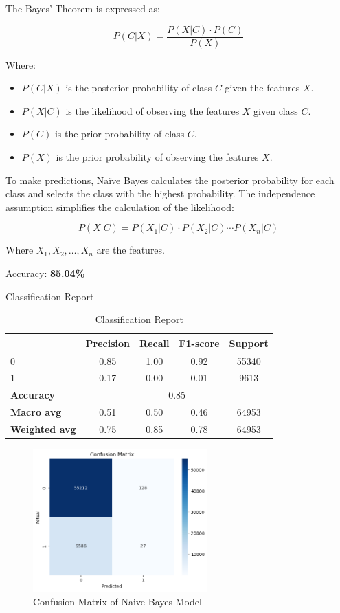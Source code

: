 The Bayes' Theorem is expressed as:

\[
P(C | X) = \frac{P(X | C) \cdot P(C)}{P(X)}
\]

Where:
\begin{itemize}
    \item \( P(C | X) \) is the posterior probability of class \( C \) given the features \( X \).
    \item \( P(X | C) \) is the likelihood of observing the features \( X \) given class \( C \).
    \item \( P(C) \) is the prior probability of class \( C \).
    \item \( P(X) \) is the prior probability of observing the features \( X \).
\end{itemize}

To make predictions, Naïve Bayes calculates the posterior probability for each class and selects the class with the highest probability. The independence assumption simplifies the calculation of the likelihood:

\[
P(X | C) = P(X_1 | C) \cdot P(X_2 | C) \cdots P(X_n | C)
\]

Where \( X_1, X_2, \ldots, X_n \) are the features.

Accuracy: \textbf{85.04\%}


Classification Report
\begin{table}[h]
    \centering
    \begin{tabular}{lcccc}
        \toprule
        & \textbf{Precision} & \textbf{Recall} & \textbf{F1-score} & \textbf{Support} \\
        \midrule
        0 & 0.85 & 1.00 & 0.92 & 55340 \\
        1 & 0.17 & 0.00 & 0.01 & 9613 \\
        \midrule
        \textbf{Accuracy} & \multicolumn{4}{c}{0.85} \\
        \textbf{Macro avg} & 0.51 & 0.50 & 0.46 & 64953 \\
        \textbf{Weighted avg} & 0.75 & 0.85 & 0.78 & 64953 \\
        \bottomrule
    \end{tabular}
    \caption{Classification Report}
    \label{tab:classification_report}
\end{table}

\begin{figure}[h] 
    \centering 
    \includegraphics[width=0.6\textwidth]{media/naive_bayes_confusion_matrix.png}
    \caption{Confusion Matrix of Naive Bayes Model}

\end{figure}

